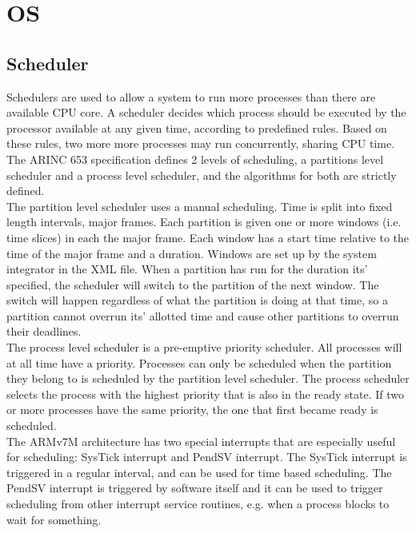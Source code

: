 \section{OS}
\subsection{Scheduler}
Schedulers are used to allow a system to run more processes than there are
available CPU core. 
A scheduler decides which process should be executed by the processor available
at any given time, according to predefined rules. Based on these rules, two more
more processes may run concurrently, sharing CPU time. The ARINC 653
specification defines 2 levels of scheduling, a partitions level scheduler and a
process level scheduler, and the algorithms for both are strictly defined.\\

The partition level scheduler uses a manual scheduling. Time is split into fixed
length intervals, major frames. Each partition is given one or more windows
(i.e. time slices) in each the major frame. Each window has a start time
relative to the time of the major frame and a duration. Windows are set up by
the system integrator in the XML file.\cite{arinc_part_scheduling}
When a partition has run for the duration its' specified, the scheduler will
switch to the partition of the next window. The switch will happen regardless of
what the partition is doing at that time, so a partition cannot overrun its'
allotted time and cause other partitions to overrun their deadlines.\\

The process level scheduler is a pre-emptive priority scheduler. All processes 
will at all time have a priority. Processes can only be scheduled when the
partition they belong to is scheduled by the partition level scheduler. The
process scheduler selects the process with the highest priority that is also
in the ready state. If two or more processes have the same priority, the one
that first became ready is scheduled.\cite{arinc_pro_scheduling}\\

The ARMv7M architecture has two special interrupts that are especially useful
for scheduling: SysTick interrupt and PendSV interrupt. The SysTick interrupt is
triggered in a regular interval, and can be used for time based scheduling. The
PendSV interrupt is triggered by software itself and it can be used to trigger 
scheduling from other interrupt service routines, e.g. when a process blocks to
wait for something.

